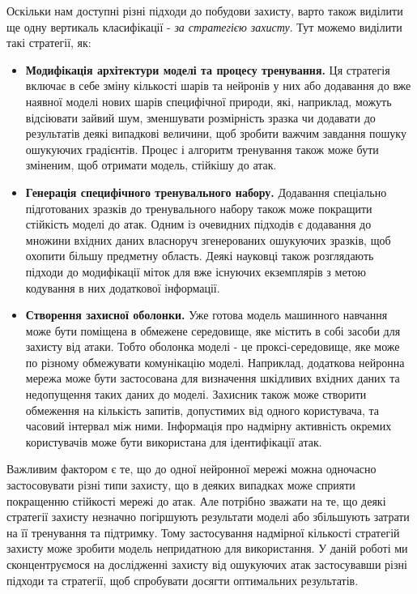 \documentclass[14pt,a4paper]{extarticle}
\newcounter{e}
\numberwithin{equation}{section}
\numberwithin{figure}{section}
\begin{document}
 Оскільки нам доступні різні підходи до побудови захисту, варто також виділити ще одну вертикаль класифікації - \textit{за стратегією захисту}. Тут можемо виділити такі стратегії, як:
 
 \begin{itemize}
 	\item \textbf{Модифікація архітектури моделі та процесу тренування.} Ця стратегія включає в себе зміну кількості шарів та нейронів у них або додавання до вже наявної моделі нових шарів специфічної природи, які, наприклад, можуть відсіювати зайвий шум, зменшувати розмірність зразка чи додавати до результатів деякі випадкові величини, щоб зробити важчим завдання пошуку ошукуючих градієнтів. Процес і алгоритм тренування також може бути зміненим, щоб отримати модель, стійкішу до атак.
 	
 	\item \textbf{Генерація специфічного тренувального набору.} Додавання спеціально підготованих зразків до тренувального набору також може покращити стійкість моделі до атак. Одним із очевидних підходів є додавання до множини вхідних даних власноруч згенерованих ошукуючих зразків, щоб охопити більшу предметну область. Деякі науковці також розглядають підходи до модифікації міток для вже існуючих екземплярів з метою кодування в них додаткової інформації.
 	
 	\item \textbf{Створення захисної оболонки.} Уже готова модель машинного навчання може бути поміщена в обмежене середовище, яке містить в собі засоби для захисту від атаки. Тобто оболонка моделі - це проксі-середовище, яке може по різному обмежувати комунікацію моделі. Наприклад, додаткова нейронна мережа може бути застосована для визначення шкідливих вхідних даних та недопущення таких даних до моделі. Захисник також може створити обмеження на кількість запитів, допустимих від одного користувача, та часовий інтервал між ними. Інформація про надмірну активність окремих користувачів може бути використана для ідентифікації атак.
 \end{itemize}
 
 Важливим фактором є те, що до одної нейронної мережі можна одночасно застосовувати різні типи захисту, що в деяких випадках може сприяти покращенню стійкості мережі до атак. Але потрібно зважати на те, що деякі стратегії захисту незначно погіршують результати моделі або збільшують затрати на її тренування та підтримку. Тому застосування надмірної кількості стратегій захисту може зробити модель непридатною для використання. У даній роботі ми сконцентруємося на дослідженні захисту від ошукуючих атак застосувавши різні підходи та стратегії, щоб спробувати досягти оптимальних результатів.
 
\end{document}
